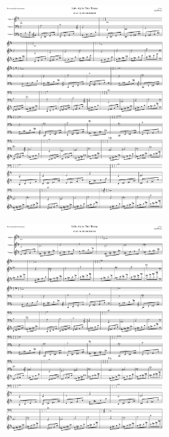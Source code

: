 \begin{figure}[H]                                             
{                                                             
  \setlength{\tabcolsep}{3.0pt}                               
  \setlength\cmidrulewidth{\heavyrulewidth} %
    \begin{subfigure}{0.5\textwidth}                            
  \includegraphics[width=6cm]{music/title_no_65_page_1001.png}%
    \end{subfigure}                                             
  \begin{subfigure}{0.5\textwidth}                            
  \includegraphics[width=6cm]{music/title_no_66_page_1001.png}%
    \end{subfigure}                                             
}                                                             
\end{figure}                                                  


